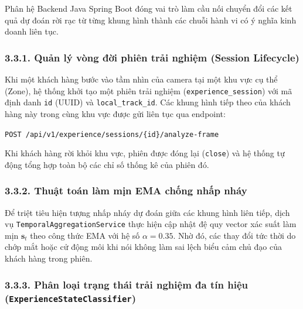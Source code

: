 Phân hệ Backend Java Spring Boot đóng vai trò làm cầu nối chuyển đổi các kết quả dự đoán rời rạc từ từng khung hình thành các chuỗi hành vi có ý nghĩa kinh doanh liên tục.

\subsubsection*{3.3.1. Quản lý vòng đời phiên trải nghiệm (Session Lifecycle)}

Khi một khách hàng bước vào tầm nhìn của camera tại một khu vực cụ thể (Zone), hệ thống khởi tạo một phiên trải nghiệm (\texttt{experience\_session}) với mã định danh \texttt{id} (UUID) và \texttt{local\_track\_id}. Các khung hình tiếp theo của khách hàng này trong cùng khu vực được gửi liên tục qua endpoint:
\begin{center}
\texttt{POST /api/v1/experience/sessions/\{id\}/analyze-frame}
\end{center}
Khi khách hàng rời khỏi khu vực, phiên được đóng lại (\texttt{close}) và hệ thống tự động tổng hợp toàn bộ các chỉ số thống kê của phiên đó.

\subsubsection*{3.3.2. Thuật toán làm mịn EMA chống nhấp nháy}

Để triệt tiêu hiện tượng nhấp nháy dự đoán giữa các khung hình liên tiếp, dịch vụ \texttt{TemporalAggregationService} thực hiện cập nhật đệ quy vector xác suất làm mịn $\bm{s}_t$ theo công thức EMA với hệ số $\alpha = 0.35$. Nhờ đó, các thay đổi tức thời do chớp mắt hoặc cử động môi khi nói không làm sai lệch biểu cảm chủ đạo của khách hàng trong phiên.

\subsubsection*{3.3.3. Phân loại trạng thái trải nghiệm đa tín hiệu (\texttt{ExperienceStateClassifier})}

